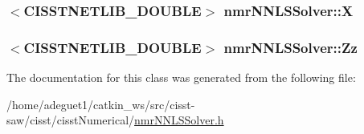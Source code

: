 \hypertarget{classnmr_n_n_l_s_solver_af7ff95aeea4da8d86ac0fd4bc9a220b4}{
\subsubsection[{X}]{$<$C\-I\-S\-S\-T\-N\-E\-T\-L\-I\-B\-\_\-\-D\-O\-U\-B\-L\-E$>$ nmr\-N\-N\-L\-S\-Solver\-::\-X\hspace{0.3cm}{\ttfamily [protected]}}}\label{classnmr_n_n_l_s_solver_af7ff95aeea4da8d86ac0fd4bc9a220b4}
\hypertarget{classnmr_n_n_l_s_solver_ad4d4544b5db001588a0b9742a0b93abc}{
\subsubsection[{Zz}]{$<$C\-I\-S\-S\-T\-N\-E\-T\-L\-I\-B\-\_\-\-D\-O\-U\-B\-L\-E$>$ nmr\-N\-N\-L\-S\-Solver\-::\-Zz\hspace{0.3cm}{\ttfamily [protected]}}}\label{classnmr_n_n_l_s_solver_ad4d4544b5db001588a0b9742a0b93abc}


The documentation for this class was generated from the following file\-:\begin{DoxyCompactItemize}
\item 
/home/adeguet1/catkin\-\_\-ws/src/cisst-\/saw/cisst/cisst\-Numerical/\hyperlink{nmr_n_n_l_s_solver_8h}{nmr\-N\-N\-L\-S\-Solver.\-h}\end{DoxyCompactItemize}
